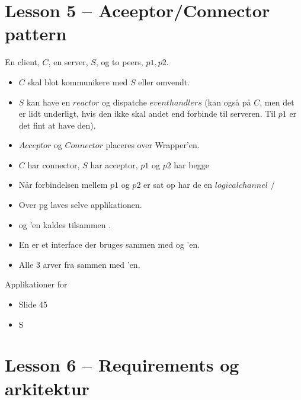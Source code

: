 \documentclass[oneside, 10pt]{memoir}
\begin{document}
\newpage
\section*{Lesson 5 -- Aceeptor/Connector pattern}

En client, $C$, en server, $S$, og to peers, $p1, p2$.
\begin{itemize}
	\item $C$ skal blot kommunikere med $S$ eller omvendt.
	\item $S$ kan have en $reactor$ og dispatche $event handlers$ (kan også på $C$, men det er lidt underligt, hvis den ikke skal andet end forbinde til serveren. Til $p1$ er det fint at have den).
	\item $Acceptor$ og $Connector$ placeres over Wrapper'en.
	\item $C$ har connector, $S$ har acceptor, $p1$ og $p2$ har begge
	\item Når forbindelsen mellem $p1$ og $p2$ er sat op har de en $logical channel$ /  
	\item Over  pg  laves selve applikationen.
	\item {} og 'en kaldes tilsammen .
	\item En  er et interface der bruges sammen med  og 'en.
	\item Alle 3 arver fra  sammen med 'en.
\end{itemize}
Applikationer for 
\begin{itemize}
	\item Slide 45
	\item S
\end{itemize}


\newpage
\section*{Lesson 6 -- Requirements og arkitektur}
\end{document}
